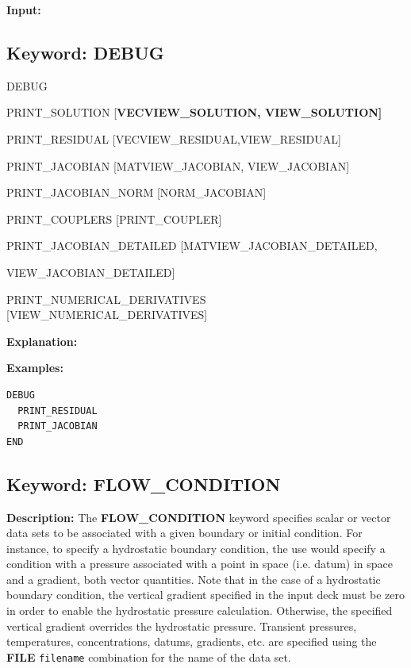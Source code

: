 \documentclass[12pt]{article}
\begin{document}
\newpage
\protect\hypertarget{target_dbg}{}

{\noindent\bf Input:}

\subsection{Keyword: DEBUG}
\begin{deflist}{00}
\item[DEBUG]~
\begin{deflist}{00}
\item[PRINT\_SOLUTION] [\bf VECVIEW\_SOLUTION, VIEW\_SOLUTION]
\item[PRINT\_RESIDUAL] [VECVIEW\_RESIDUAL,VIEW\_RESIDUAL]
\item[PRINT\_JACOBIAN] [MATVIEW\_JACOBIAN, VIEW\_JACOBIAN]
\item[PRINT\_JACOBIAN\_NORM] [NORM\_JACOBIAN]
\item[PRINT\_COUPLERS] [PRINT\_COUPLER]
\item[PRINT\_JACOBIAN\_DETAILED] [MATVIEW\_JACOBIAN\_DETAILED, 

VIEW\_JACOBIAN\_DETAILED]

\item[PRINT\_NUMERICAL\_DERIVATIVES] [VIEW\_NUMERICAL\_DERIVATIVES]

\end{deflist}
\item[\keyend]
\end{deflist}

{\noindent\bf Explanation:}

\bigskip

\begin{mdframed}

{\noindent\bf Examples:}
\begin{verbatim}
DEBUG
  PRINT_RESIDUAL
  PRINT_JACOBIAN
END
\end{verbatim}
\end{mdframed}

\hyperlink{target_key}{\return}


\newpage
\protect\hypertarget{target_flow_cond}{}

\subsection{Keyword: FLOW\_CONDITION}

{\noindent\bf Description:}
The {\bf FLOW\_CONDITION} keyword specifies scalar or vector data sets to be associated with a given boundary or initial condition.  For instance, to specify a hydrostatic boundary condition, the use would specify a condition with a pressure associated with a point in space (i.e. datum) in space and a gradient, both vector quantities.  Note that in the case of a hydrostatic boundary condition, the vertical gradient specified in the input deck must be zero in order to enable the hydrostatic pressure calculation.  Otherwise, the specified vertical gradient overrides the hydrostatic pressure.  Transient pressures, temperatures, concentrations, datums, gradients, etc. are specified using the {\bf FILE} {\tt filename} combination for the name of the data set.
\end{document}
